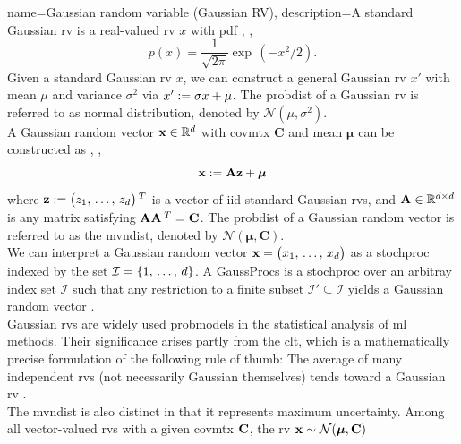 {name={Gaussian random variable (Gaussian RV)},
	description={A  standard Gaussian \gls{rv} is a 
		real-valued \gls{rv} $x$ with \gls{pdf} \cite{BertsekasProb}, \cite{GrayProbBook}, \cite{papoulis}
		\begin{equation}
			\nonumber
			p(x) = \frac{1}{\sqrt{2\pi}} \exp\,(-x^2/2). 
		\end{equation}
		Given a standard Gaussian \gls{rv} $x$, we can construct a general Gaussian \gls{rv} $x'$ with 
		\gls{mean} $\mu$ and \gls{variance} $\sigma^2$ via $x' := \sigma x + \mu$. The \gls{probdist} of a 
		Gaussian \gls{rv} is referred to as normal distribution, denoted by $\mathcal{N}(\mu, \sigma^2)$. 
		\\ 
		A Gaussian random \gls{vector} ${\bf x} \in \mathbb{R}^{d}$ with 
		\gls{covmtx} $\mathbf{C}$ and \gls{mean} ${\bm \mu}$ can be constructed as \cite{GrayProbBook}, \cite{papoulis}, \cite{Lapidoth09}
		\[
		{\bf x} := \mathbf{A} {\bf z} + {\bm \mu}
		\]
		where ${\bf z} := \big( z_{1}, \,\ldots, \,z_{d} \big)\,^{T}$ is a \gls{vector} 
		of \gls{iid} standard Gaussian \gls{rv}s, and ${\bf A} \in \mathbb{R}^{d \times d}$ is any \gls{matrix} satisfying ${\bf A} {\bf A}\,^{T} = {\bf C}$. 
		The \gls{probdist} of a Gaussian random \gls{vector} is referred to as the \gls{mvndist}, 
		denoted by $\mathcal{N}({\bm \mu}, \mathbf{C})$.
		\\
		We can interpret a Gaussian random \gls{vector} ${\bf x}=\big(x_{1},\,\ldots,\,x_{d}\big)$ as a \gls{stochproc} 
		indexed by the set $\mathcal{I}=\{1,\,\ldots,\,d\}$. A \gls{GaussProc}s is a 
		\gls{stochproc} over an arbitray index set $\mathcal{I}$ such that any restriction to a finite subset 
		$\mathcal{I}' \subseteq \mathcal{I}$ yields a Gaussian random \gls{vector} \cite{Rasmussen2006Gaussian}.
  		\\
        		Gaussian \gls{rv}s are widely used \gls{probmodel}s in the statistical analysis of 
        		\gls{ml} methods. Their significance arises partly from the \gls{clt}, which is a mathematically 
        		precise formulation of the following rule of thumb: The average of many independent \gls{rv}s 
		(not necessarily Gaussian themselves) tends toward a Gaussian \gls{rv} \cite{ross2013first}.
		\\ 
		The \gls{mvndist} is also distinct in that it represents \gls{maximum} \gls{uncertainty}. 
		Among all \gls{vector}-valued \gls{rv}s with a given \gls{covmtx} ${\bf C}$, the \gls{rv} ${\bf x} \sim \mathcal{N}({\bm \mu}, \mathbf{C})$ 
}}

